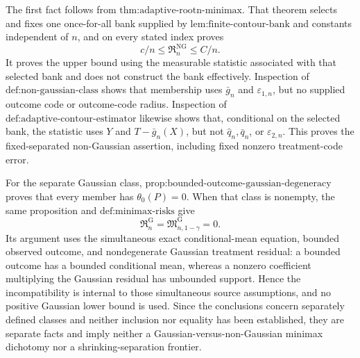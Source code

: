 The first fact follows from \(\text{thm:adaptive-rootn-minimax}\).  That theorem selects and fixes one once-for-all bank supplied by \(\text{lem:finite-contour-bank}\) and constants independent of \(n\), and on every stated index proves
\[
 c/n\le\mathfrak R_n^{\mathrm{NG}}\le C/n.
\]
It proves the upper bound using the measurable statistic associated with that selected bank and does not construct the bank effectively.  Inspection of \(\text{def:non-gaussian-class}\) shows that membership uses \(\bar g_n\) and \(\varepsilon_{1,n}\), but no supplied outcome code or outcome-code radius.  Inspection of \(\text{def:adaptive-contour-estimator}\) likewise shows that, conditional on the selected bank, the statistic uses \(Y\) and \(T-\bar g_n(X)\), but not \(\widehat q_n,\bar q_n\), or \(\varepsilon_{2,n}\).  This proves the fixed-separated non-Gaussian assertion, including fixed nonzero treatment-code error.

For the separate Gaussian class, \(\text{prop:bounded-outcome-gaussian-degeneracy}\) proves that every member has \(\theta_0(P)=0\).  When that class is nonempty, the same proposition and \(\text{def:minimax-risks}\) give
\[
 \mathfrak R_n^{\mathrm G}=\mathfrak M_{n,1-\gamma}^{\mathrm G}=0.
\]
Its argument uses the simultaneous exact conditional-mean equation, bounded observed outcome, and nondegenerate Gaussian treatment residual: a bounded outcome has a bounded conditional mean, whereas a nonzero coefficient multiplying the Gaussian residual has unbounded support.  Hence the incompatibility is internal to those simultaneous source assumptions, and no positive Gaussian lower bound is used.  Since the conclusions concern separately defined classes and neither inclusion nor equality has been established, they are separate facts and imply neither a Gaussian-versus-non-Gaussian minimax dichotomy nor a shrinking-separation frontier.